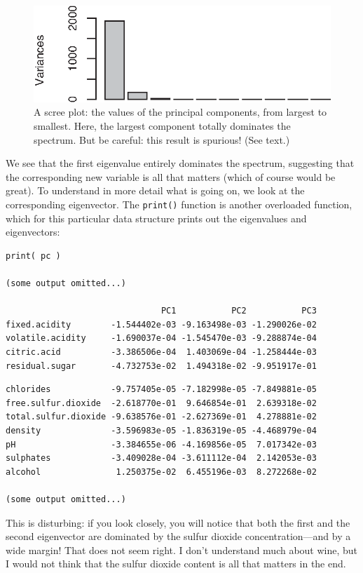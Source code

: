 \begin{figure}
  \centerline{\includegraphics{img/screeplot}}
  \caption{A scree plot: the values of the principal components, from
    largest to smallest. Here, the largest component totally dominates
    the spectrum. But be careful: this result is spurious! (See
    text.)}
  \label{fig:screeplot}
\end{figure}

We see that the first eigenvalue entirely dominates the spectrum,
suggesting that the corresponding new variable is all that matters
(which of course would be great). To understand in more detail what is
going on, we look at the corresponding eigenvector.   The
\texttt{print()} function is another overloaded function, which for
this particular data structure prints out the eigenvalues and
eigenvectors:

\begin{verbatim}
print( pc )

(some output omitted...)

                               PC1           PC2           PC3
fixed.acidity        -1.544402e-03 -9.163498e-03 -1.290026e-02
volatile.acidity     -1.690037e-04 -1.545470e-03 -9.288874e-04
citric.acid          -3.386506e-04  1.403069e-04 -1.258444e-03
residual.sugar       -4.732753e-02  1.494318e-02 -9.951917e-01
\end{verbatim}
\begin{verbatim}
chlorides            -9.757405e-05 -7.182998e-05 -7.849881e-05
free.sulfur.dioxide  -2.618770e-01  9.646854e-01  2.639318e-02
total.sulfur.dioxide -9.638576e-01 -2.627369e-01  4.278881e-02
density              -3.596983e-05 -1.836319e-05 -4.468979e-04
pH                   -3.384655e-06 -4.169856e-05  7.017342e-03
sulphates            -3.409028e-04 -3.611112e-04  2.142053e-03
alcohol               1.250375e-02  6.455196e-03  8.272268e-02

(some output omitted...)
\end{verbatim}

This is disturbing: if you look closely, you will notice that both the
first and the second eigenvector are dominated by the sulfur dioxide
concentration---and by a wide margin!  That does not seem right. I
don't understand much about wine, but I would not think that the
sulfur dioxide content is all that matters in the end.

